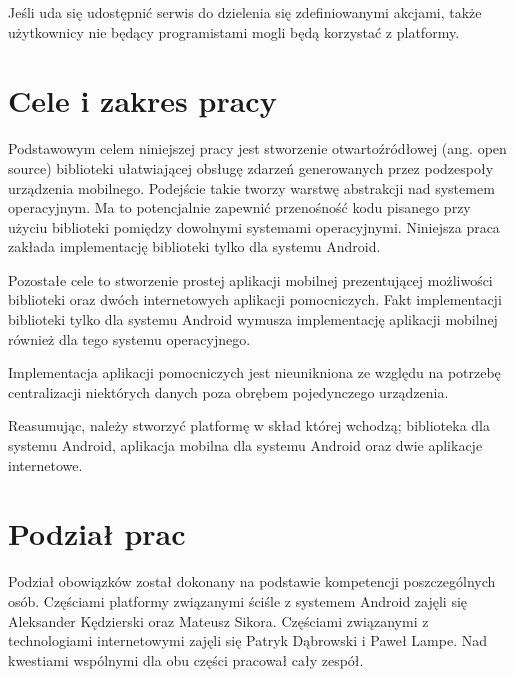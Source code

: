 \documentclass[11pt,a4paper,polish,thesis]{dcsbook}
\begin{document}
Jeśli uda się udostępnić serwis do dzielenia się zdefiniowanymi akcjami, także użytkownicy nie będący programistami mogli będą korzystać z platformy.
\section{Cele i zakres pracy}
Podstawowym celem niniejszej pracy jest stworzenie otwartoźródłowej (ang. open source) biblioteki ułatwiającej obsługę zdarzeń generowanych przez podzespoły
urządzenia mobilnego. Podejście takie tworzy warstwę abstrakcji nad systemem operacyjnym. Ma to potencjalnie zapewnić przenośność kodu pisanego przy użyciu
biblioteki pomiędzy dowolnymi systemami operacyjnymi. Niniejsza praca zakłada implementację biblioteki tylko dla systemu Android.

Pozostałe cele to stworzenie prostej aplikacji mobilnej prezentującej możliwości biblioteki oraz dwóch internetowych aplikacji pomocniczych. Fakt implementacji
biblioteki tylko dla systemu Android wymusza implementację aplikacji mobilnej również dla tego systemu operacyjnego.

Implementacja aplikacji pomocniczych jest nieunikniona ze względu na potrzebę centralizacji niektórych danych poza obrębem pojedynczego urządzenia.

Reasumując, należy stworzyć platformę w skład której wchodzą; biblioteka dla systemu Android, aplikacja mobilna dla systemu Android oraz dwie aplikacje internetowe.
\section{Podział prac}
Podział obowiązków został dokonany na podstawie kompetencji poszczególnych osób. Częściami platformy związanymi ściśle z systemem Android zajęli się Aleksander
Kędzierski oraz Mateusz Sikora. Częściami związanymi z technologiami internetowymi zajęli się Patryk Dąbrowski i Paweł Lampe. Nad kwestiami wspólnymi dla obu części
pracował cały zespół.
\end{document}
